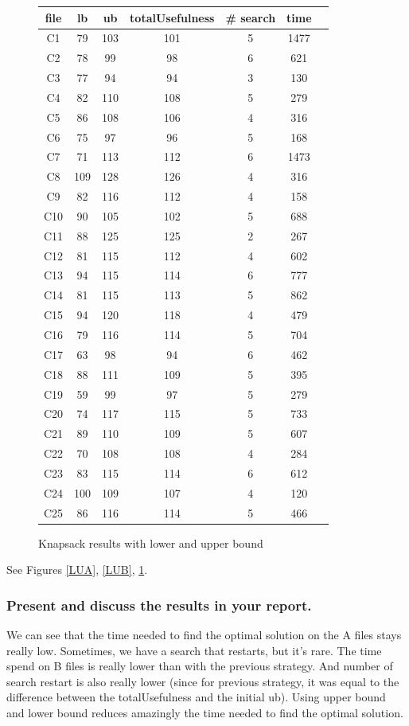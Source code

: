\documentclass[a4paper ,12pt,french]{article}
\begin{document}
\begin{figure}[!h]
\begin{tabular}{|c|c|c|c|c|c|c|}
\hline
file&lb&ub&totalUsefulness&\# search&time\\
\hline
\hline

C1&79&103&101&5&1477\\\hline
C2&78&99&98&6&621\\\hline
C3&77&94&94&3&130\\\hline
C4&82&110&108&5&279\\\hline
C5&86&108&106&4&316\\\hline
C6&75&97&96&5&168\\\hline
C7&71&113&112&6&1473\\\hline
C8&109&128&126&4&316\\\hline
C9&82&116&112&4&158\\\hline
C10&90&105&102&5&688\\\hline
C11&88&125&125&2&267\\\hline
C12&81&115&112&4&602\\\hline
C13&94&115&114&6&777\\\hline
C14&81&115&113&5&862\\\hline
C15&94&120&118&4&479\\\hline
C16&79&116&114&5&704\\\hline
C17&63&98&94&6&462\\\hline
C18&88&111&109&5&395\\\hline
C19&59&99&97&5&279\\\hline
C20&74&117&115&5&733\\\hline
C21&89&110&109&5&607\\\hline
C22&70&108&108&4&284\\\hline
C23&83&115&114&6&612\\\hline
C24&100&109&107&4&120\\\hline
C25&86&116&114&5&466\\\hline

\end{tabular}
\caption{Knapsack results with lower and upper bound}
\label{LUC}
\end{figure}


See Figures \ref{LUA}, \ref{LUB}, \ref{LUC}.

\subsubsection{Present and discuss the results in your report.}

We can see that the time needed to find the optimal solution on the A files stays really low. Sometimes, we have a search that restarts, but it's rare.
The time spend on B files is really lower than with the previous strategy. And number of search restart is also really lower (since for previous strategy, it was equal to the difference between the totalUsefulness and the initial ub).
Using upper bound and lower bound reduces amazingly the time needed to find the optimal solution.
\end{document}

